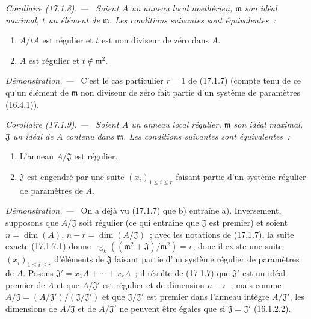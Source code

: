 \documentclass[10pt,oneside]{book}
\makeatletter
\newcommand{\setmanualcurrentlabel}[1]{\def\@currentlabel{#1}}
\newenvironment{corollary}[1][]{%
  \setmanualcurrentlabel{#1}\par\medskip\noindent\itshape Corollaire (#1). ---\ }{\par}
\newenvironment{proof}{%
  \par\medskip\noindent\textit{Démonstration. ---\ }}{\par}
\makeatother
\begin{document}
\begin{corollary}[17.1.8]
\label{0.17.1.8-fr}
Soient $A$ un anneau local noethérien, $\mathfrak{m}$ son idéal maximal, $t$ un
élément de $\mathfrak{m}$. Les conditions suivantes sont équivalentes~:
\begin{enumerate}
  \item[\rm a)] $A/tA$ est régulier et $t$ est non diviseur de zéro dans $A$.
  \item[\rm b)] $A$ est régulier et $t\notin\mathfrak{m}^2$.
\end{enumerate}
\end{corollary}

\begin{proof}
C'est le cas particulier $r=1$ de (17.1.7) (compte tenu de ce qu'un élément de
$\mathfrak{m}$ non diviseur de zéro fait partie d'un système de paramètres
(16.4.1)).
\end{proof}

\begin{corollary}[17.1.9]
\label{0.17.1.9-fr}
Soient $A$ un anneau local régulier, $\mathfrak{m}$ son idéal maximal,
$\mathfrak{J}$ un idéal de $A$ contenu dans $\mathfrak{m}$. Les conditions
suivantes sont équivalentes~:
\begin{enumerate}
  \item[\rm a)] L'anneau $A/\mathfrak{J}$ est régulier.
  \item[\rm b)] $\mathfrak{J}$ est engendré par une suite
  $(x_i)_{1\leq i\leq r}$ faisant partie d'un système régulier de paramètres
  de $A$.
\end{enumerate}
\end{corollary}

\begin{proof}
On a déjà vu (17.1.7) que b) entraîne a). Inversement, supposons que
$A/\mathfrak{J}$ soit régulier (ce qui entraîne que $\mathfrak{J}$ est premier)
et soient $n=\dim(A)$, $n-r=\dim(A/\mathfrak{J})$~; avec les notations de
(17.1.7), la suite exacte (17.1.7.1) donne
$\operatorname{rg}_k((\mathfrak{m}^2+\mathfrak{J})/\mathfrak{m}^2)=r$, donc il
existe une suite $(x_i)_{1\leq i\leq r}$ d'éléments de $\mathfrak{J}$ faisant
partie d'un système régulier de paramètres de $A$. Posons
$\mathfrak{J}'=x_1A+\cdots+x_rA$~; il résulte de (17.1.7) que $\mathfrak{J}'$
est un idéal premier de $A$ et que $A/\mathfrak{J}'$ est régulier et de
dimension $n-r$~; mais comme
$A/\mathfrak{J}=(A/\mathfrak{J}')/(\mathfrak{J}/\mathfrak{J}')$ et que
$\mathfrak{J}/\mathfrak{J}'$ est premier dans l'anneau intègre
$A/\mathfrak{J}'$, les dimensions de $A/\mathfrak{J}$ et de
$A/\mathfrak{J}'$ ne peuvent être égales que si
$\mathfrak{J}=\mathfrak{J}'$ (16.1.2.2).
\end{proof}
\end{document}
